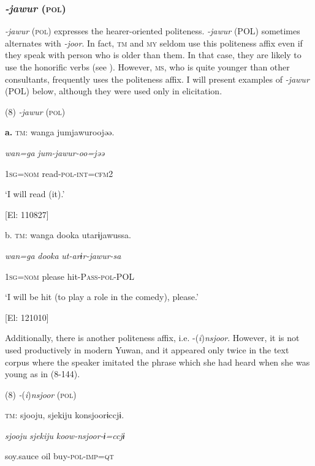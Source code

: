 \subsubsection{\textit{{}-jawur} (\textsc{pol})}

\textit{{}-jawur} (\textsc{pol}) expresses the hearer-oriented politeness. \textit{{}-jawur} (POL) sometimes alternates with \textit{{}-joor}. In fact, \textsc{tm} and \textsc{my} seldom use this politeness affix even if they speak with person who is older than them. In that case, they are likely to use the honorific verbs (see ). However, \textsc{ms}, who is quite younger than other consultants, frequently uses the politeness affix. I will present examples of \textit{{}-jawur} (POL) below, although they were used only in elicitation.

(8)  \textit{{}-jawur} (\textsc{pol})

  \textbf{a.}  \textsc{tm}:  wanga  jumjawuroojəə.

      \textit{wan=ga}  \textit{jum-jawur{}-oo=jəə}

      1\textsc{sg}=\textsc{nom}  read-\textsc{pol}-\textsc{int}=\textsc{cfm}2

      ‘I will read (it).’

      [El: 110827]

  b.  \textsc{tm}:  wanga  dooka  utarɨjawussa.

      \textit{wan=ga}  \textit{dooka}  \textit{ut-arɨr-jawur{}-sa}

      1\textsc{sg}=\textsc{nom}  please  hit-P\textsc{ass}-\textsc{pol}-POL

      ‘I will be hit (to play a role in the comedy), please.’

      [El: 121010]

  Additionally, there is another politeness affix, i.e. -(\textit{i})\textit{nsjoor}. However, it is not used productively in modern Yuwan, and it appeared only twice in the text corpus where the speaker imitated the phrase which she had heard when she was young as in (8-144).

(8)  \textit{{}-}(\textit{i})\textit{nsjoor} (\textsc{pol})

  \textsc{tm}:  {\textbar}sjooju,  sjekiju{\textbar}  konsjoorɨccjɨ.

    \textit{sjooju}  \textit{sjekiju}  \textit{koow-nsjoor{}-ɨ=ccjɨ}

    soy.sauce  oil  buy-\textsc{pol}-\textsc{imp}=\textsc{qt}

